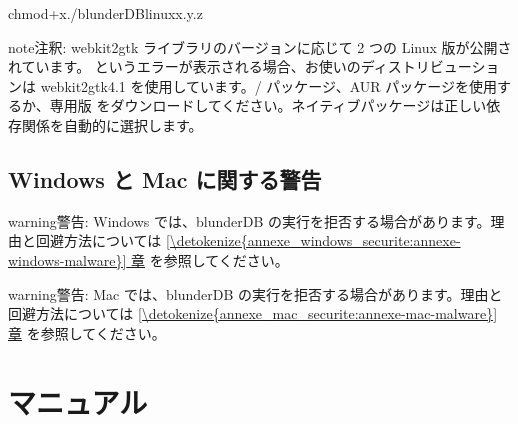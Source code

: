 \documentclass[letterpaper,10pt,dvipdfmx]{sphinxmanual}
\begin{document}
\begin{sphinxVerbatim}[commandchars=\\\{\}]
chmod+x./blunderDB\PYGZhy{}linux\PYGZhy{}x.y.z
\end{sphinxVerbatim}

\begin{sphinxadmonition}{note}{注釈:}
\sphinxAtStartPar
webkit2gtk ライブラリのバージョンに応じて 2 つの Linux 版が公開されています。 というエラーが表示される場合、お使いのディストリビューションは webkit2gtk\sphinxhyphen{}4.1 を使用しています。/ パッケージ、AUR パッケージを使用するか、専用版  をダウンロードしてください。ネイティブパッケージは正しい依存関係を自動的に選択します。
\end{sphinxadmonition}


\subsection{Windows と Mac に関する警告}
\label{\detokenize{telecharge_install:avertissements-windows-et-mac}}
\begin{sphinxadmonition}{warning}{警告:}
\sphinxAtStartPar
Windows では、blunderDB の実行を拒否する場合があります。理由と回避方法については \hyperref[\detokenize{annexe_windows_securite:annexe-windows-malware}]{\ref{\detokenize{annexe_windows_securite:annexe-windows-malware}} 章} を参照してください。
\end{sphinxadmonition}

\begin{sphinxadmonition}{warning}{警告:}
\sphinxAtStartPar
Mac では、blunderDB の実行を拒否する場合があります。理由と回避方法については \hyperref[\detokenize{annexe_mac_securite:annexe-mac-malware}]{\ref{\detokenize{annexe_mac_securite:annexe-mac-malware}} 章} を参照してください。
\end{sphinxadmonition}

\sphinxstepscope


\section{マニュアル}
\label{\detokenize{manuel:manuel}}\label{\detokenize{manuel:id1}}\label{\detokenize{manuel::doc}}
\end{document}
